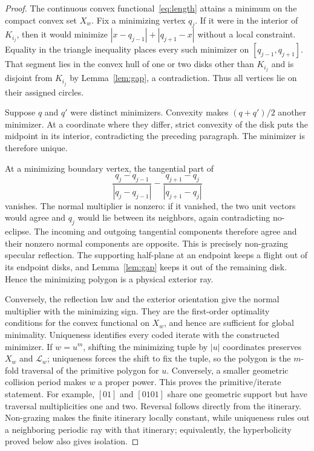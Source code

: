 \documentclass[10pt]{article}
\begin{document}
\begin{proof}
The continuous convex functional~\eqref{eq:length} attains a minimum on the
compact convex set $X_w$.  Fix a minimizing vertex $q_j$.  If it were in the
interior of $K_{i_j}$, then it would minimize
$|x-q_{j-1}|+|q_{j+1}-x|$ without a local constraint.  Equality in the
triangle inequality places every such minimizer on
$[q_{j-1},q_{j+1}]$.  That segment lies in the convex hull of one or two
disks other than $K_{i_j}$ and is disjoint from $K_{i_j}$ by
Lemma~\ref{lem:gap}, a contradiction.  Thus all vertices lie on their
assigned circles.

Suppose $q$ and $q'$ were distinct minimizers.  Convexity makes
$(q+q')/2$ another minimizer.  At a coordinate where they differ, strict
convexity of the disk puts the midpoint in its interior, contradicting the
preceding paragraph.  The minimizer is therefore unique.

At a minimizing boundary vertex, the tangential part of
\[
 \frac{q_j-q_{j-1}}{|q_j-q_{j-1}|}
 -\frac{q_{j+1}-q_j}{|q_{j+1}-q_j|}
\]
vanishes.  The normal multiplier is nonzero: if it vanished, the two unit
vectors would agree and $q_j$ would lie between its neighbors, again
contradicting no-eclipse.  The incoming and outgoing tangential components
therefore agree and their nonzero normal components are opposite.  This is
precisely non-grazing specular reflection.  The supporting half-plane at an
endpoint keeps a flight out of its endpoint disks, and Lemma~\ref{lem:gap}
keeps it out of the remaining disk.  Hence the minimizing polygon is a
physical exterior ray.

Conversely, the reflection law and the exterior orientation give the normal
multiplier with the minimizing sign.  They are the first-order optimality
conditions for the convex functional on $X_w$, and hence are sufficient for
global minimality.  Uniqueness identifies every coded iterate with the
constructed minimizer.  If $w=u^m$, shifting the minimizing tuple by $|u|$
coordinates preserves $X_w$ and $\mathcal L_w$; uniqueness forces the shift
to fix the tuple, so the polygon is the $m$-fold traversal of the primitive
polygon for $u$.  Conversely, a smaller geometric collision period makes
$w$ a proper power.  This proves the primitive/iterate statement.  For
example, $[01]$ and $[0101]$ share one geometric support but have traversal
multiplicities one and two.  Reversal follows directly from the itinerary.
Non-grazing makes the finite itinerary locally constant, while uniqueness
rules out a neighboring periodic ray with that itinerary; equivalently, the
hyperbolicity proved below also gives isolation.
\end{proof}
\end{document}
